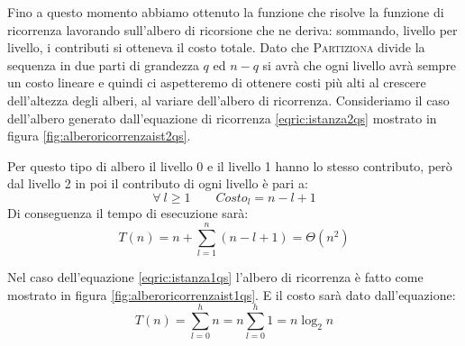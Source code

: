 Fino a questo momento abbiamo ottenuto la funzione che risolve la funzione di ricorrenza lavorando sull'albero di ricorsione che ne deriva: sommando, livello per livello, i contributi si otteneva il costo totale. Dato che \textsc{Partiziona} divide la sequenza in due parti di grandezza $q$ ed $n-q$ si avrà che ogni livello avrà sempre un costo lineare e quindi ci aspetteremo di ottenere costi più alti al crescere dell'altezza degli alberi, al variare dell'albero di ricorrenza. Consideriamo il caso dell'albero generato dall'equazione di ricorrenza \ref{eqric:istanza2qs} mostrato in figura \ref{fig:alberoricorrenzaist2qs}.

\begin{center}
	\label{fig:alberoricorrenzaist2qs}
\end{center}

Per questo tipo di albero il livello 0 e il livello 1 hanno lo stesso contributo, però dal livello 2 in poi il contributo di ogni livello è pari a:
\begin{displaymath}
	\forall \ l \geq 1 \qquad Costo_{l}=n-l+1
\end{displaymath}
Di conseguenza il tempo di esecuzione sarà:
\begin{equation}
	T(n)= n + \sum_{l=1}^{n} (n-l+1) = \Theta(n^{2})
\end{equation}

Nel caso dell'equazione \ref{eqric:istanza1qs} l'albero di ricorrenza è fatto come mostrato in figura \ref{fig:alberoricorrenzaist1qs}. E il costo sarà dato dall'equazione:
\begin{equation}
	T(n)=\sum_{l=0}^{h}n=n \sum_{l=0}^{h}1= n \log_{2} n
\end{equation}

